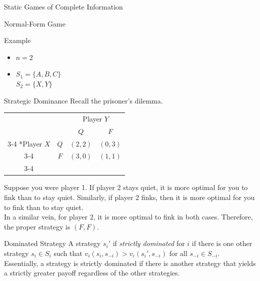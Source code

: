 \documentclass[10pt]{extarticle}
\begin{document}
\begin{problem}{Static Games of Complete Information}
\begin{problem}{Normal-Form Game}
\begin{problem}{Example}
\begin{itemize}
          \item $n = 2$
          \item $S_1 = \{A,B,C\}$\\
            $S_2 = \{X,Y\}$
        \end{itemize}
      \end{problem}
    \end{problem}
    \begin{problem}{Strategic Dominance}
      Recall the prisoner's dilemma.
      \begin{center}
        \renewcommand{\arraystretch}{1.25}
        \begin{tabular}{cc|c|c|}
          & \multicolumn{1}{c}{} & \multicolumn{2}{c}{Player $Y$}\\
          & \multicolumn{1}{c}{} & \multicolumn{1}{c}{$Q$}  & \multicolumn{1}{c}{$F$} \\\cline{3-4}
          \multirow{2}*{Player $X$}  & $Q$ & $(2,2)$ & $(0,3)$ \\\cline{3-4}
          & $F$ & $(3,0)$ & $(1,1)$ \\\cline{3-4}
        \end{tabular}
      \end{center}
      Suppose you were player 1. If player 2 stays quiet, it is more optimal for you to fink than to stay quiet. Similarly, if player 2 finks, then it is more optimal for you to fink than to stay quiet.\\

      In a similar vein, for player 2, it is more optimal to fink in both cases. Therefore, the proper strategy is $(F,F)$.\\

      \begin{problem}{Dominated Strategy}
        A strategy $s_i'$ if \textit{strictly dominated} for $i$ if there is one other strategy $s_i\in S_i$ such that $v_i(s_i,s_{-i}) > v_i(s_i',s_{-i})$ for all $s_{-i} \in S_{-i}$.\\

        Essentially, a strategy is strictly dominated if there is another strategy that yields a strictly greater payoff regardless of the other strategies.\\


\end{problem}
\end{problem}
\end{problem}
\end{document}

